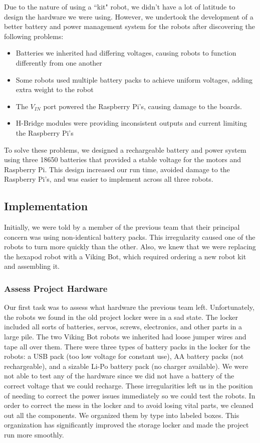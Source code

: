 \documentclass[a4paper,12pt]{article}
\begin{document}
	Due to the nature of using a ``kit" robot, we didn’t have a lot of latitude to design the hardware we were using. However, we undertook the development of a better battery and power management system for the robots after discovering the following problems:

	\begin{itemize}
		\item Batteries we inherited had differing voltages, causing robots to function differently from one another
		\item Some robots used multiple battery packs to achieve uniform voltages, adding extra weight to the robot
		\item The $V_{IN}$ port powered the Raspberry Pi's, causing damage to the boards.
		\item H-Bridge modules were providing inconsistent outputs and current limiting the Raspberry Pi's
	\end{itemize}
	
	To solve these problems, we designed a rechargeable battery and power system using three 18650 batteries that provided a stable voltage for the motors and Raspberry Pi. This design increased our run time, avoided damage to the Raspberry Pi's, and was easier to implement across all three robots.
	
\subsection{Implementation}
	Initially, we were told by a member of the previous team that their principal concern was using non-identical battery packs. This irregularity caused one of the robots to turn more quickly than the other. Also, we knew that we were replacing the hexapod robot with a Viking Bot, which required ordering a new robot kit and assembling it.

\subsubsection{Assess Project Hardware}
	Our first task was to assess what hardware the previous team left. Unfortunately, the robots we found in the old project locker were in a sad state. The locker included all sorts of batteries, servos, screws, electronics, and other parts in a large pile. The two Viking Bot robots we inherited had loose jumper wires and tape all over them. There were three types of battery packs in the locker for the robots: a USB pack (too low voltage for constant use), AA battery packs (not rechargeable), and a sizable Li-Po battery pack (no charger available). We were not able to test any of the hardware since we did not have a battery of the correct voltage that we could recharge. These irregularities left us in the position of needing to correct the power issues immediately so we could test the robots. In order to correct the mess in the locker and to avoid losing vital parts, we cleaned out all the components. We organized them by type into labeled boxes. This organization has significantly improved the storage locker and made the project run more smoothly.
	
\end{document}
